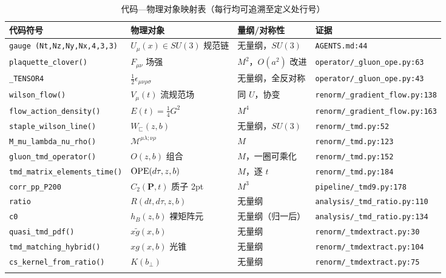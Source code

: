 \documentclass[UTF8]{ctexart}
\begin{document}
\begin{xltabular}{\textwidth}{lllX}
\toprule
代码符号 & 物理对象 & 量纲/对称性 & 证据 \\
\midrule
\endhead
\texttt{\nolinkurl{gauge (Nt,Nz,Ny,Nx,4,3,3)}} & $U_\mu(x)\in SU(3)$ 规范链 & 无量纲，$SU(3)$ & \texttt{\nolinkurl{AGENTS.md:44}} \\
\texttt{\nolinkurl{plaquette\_clover()}} & $F_{\mu\nu}$ 场强 & $M^2$，$O(a^2)$ 改进 & \texttt{\nolinkurl{operator/\_gluon\_ope.py:63}} \\
\texttt{\nolinkurl{\_TENSOR4}} & $\frac12\epsilon_{\mu\nu\rho\sigma}$ & 无量纲，全反对称 & \texttt{\nolinkurl{operator/\_gluon\_ope.py:43}} \\
\texttt{\nolinkurl{wilson\_flow()}} & $V_\mu(t)$ 流规范场 & 同 $U$，协变 & \texttt{\nolinkurl{renorm/\_gradient\_flow.py:138}} \\
\texttt{\nolinkurl{flow\_action\_density()}} & $E(t)=\frac14 G^2$ & $M^4$ & \texttt{\nolinkurl{renorm/\_gradient\_flow.py:163}} \\
\texttt{\nolinkurl{staple\_wilson\_line()}} & $W_\sqsubset(z,b)$ & 无量纲，$SU(3)$ & \texttt{\nolinkurl{renorm/\_tmd.py:52}} \\
\texttt{\nolinkurl{M\_mu\_lambda\_nu\_rho()}} & $\mathcal{M}^{\mu\lambda;\nu\rho}$ & $M$ & \texttt{\nolinkurl{renorm/\_tmd.py:123}} \\
\texttt{\nolinkurl{gluon\_tmd\_operator()}} & $O(z,b)$ 组合 & $M$，一圈可乘化 & \texttt{\nolinkurl{renorm/\_tmd.py:152}} \\
\texttt{\nolinkurl{tmd\_matrix\_elements\_time()}} & ${\rm OPE}(d\tau,z,b)$ & $M$，逐 $t$ & \texttt{\nolinkurl{renorm/\_tmd.py:184}} \\
\texttt{\nolinkurl{corr\_pp\_P200}} & $C_2(\mathbf{P},t)$ 质子 2pt & $M^3$ & \texttt{\nolinkurl{pipeline/\_tmd9.py:178}} \\
\texttt{\nolinkurl{ratio}} & $R(dt,d\tau,z,b)$ & 无量纲 & \texttt{\nolinkurl{analysis/\_tmd\_ratio.py:110}} \\
\texttt{\nolinkurl{c0}} & $h_B(z,b)$ 裸矩阵元 & 无量纲（归一后） & \texttt{\nolinkurl{analysis/\_tmd\_ratio.py:134}} \\
\texttt{\nolinkurl{quasi\_tmd\_pdf()}} & $x\tilde g(x,b)$ & 无量纲 & \texttt{\nolinkurl{renorm/\_tmdextract.py:30}} \\
\texttt{\nolinkurl{tmd\_matching\_hybrid()}} & $xg(x,b)$ 光锥 & 无量纲 & \texttt{\nolinkurl{renorm/\_tmdextract.py:104}} \\
\texttt{\nolinkurl{cs\_kernel\_from\_ratio()}} & $K(b_\perp)$ & 无量纲 & \texttt{\nolinkurl{renorm/\_tmdextract.py:75}} \\
\bottomrule
\caption{代码—物理对象映射表（每行均可追溯至定义处行号）}
\end{xltabular}
\end{document}
